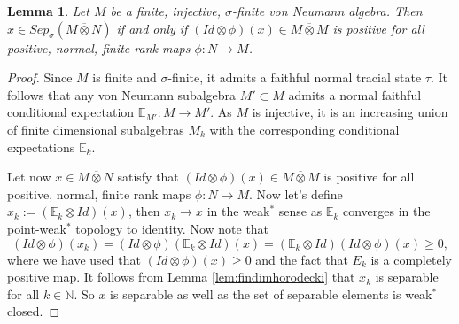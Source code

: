 \documentclass[10pt,a4paper]{amsart}
\newtheorem{lemma}{Lemma}
\begin{document}
\begin{lemma}
Let $M$ be a finite, injective, $\sigma$-finite von Neumann algebra. Then $x\in Sep_{\sigma}(M\overline{\otimes} N)$ if and only if $(Id\otimes \phi)(x) \in M\overline{\otimes} M$ is positive for all positive, normal, finite rank maps $\phi: N \to M$.
\end{lemma}

\begin{proof}
Since $M$ is finite and $\sigma$-finite, it admits a faithful normal tracial state $\tau$. It follows that any von Neumann subalgebra $M' \subset M$ admits a normal faithful conditional expectation $\mathbb{E}_{M'}: M \to M'$. As $M$ is injective, it is an increasing union of finite dimensional subalgebras $M_{k}$ with the corresponding conditional expectations $\mathbb{E}_{k}$.

Let now $x \in M \overline{\otimes} N$ satisfy that $(Id\otimes \phi)(x) \in M\overline{\otimes} M$ is positive for all positive, normal, finite rank maps $\phi: N \to M$. Now let's define $x_k:=(\mathbb{E}_{k}\otimes Id)(x)$, then $x_k\rightarrow x$ in the weak$^*$ sense as $\mathbb{E}_{k}$ converges in the point-weak$^{\ast}$ topology to identity. Now note that 
\[(Id\otimes \phi)(x_k)=(Id\otimes \phi)(\mathbb{E}_{k}\otimes Id)(x)=(\mathbb{E}_{k}\otimes Id)(Id\otimes \phi)(x)\geq0,\]
where we have used that $(Id\otimes \phi)(x)\geq 0$ and the fact that $E_k$ is a completely positive map. 
 It follows from Lemma \ref{lem:findimhorodecki} that $x_k$ is separable for all $k \in \mathbb{N}$. So $x$ is separable as well as the set of separable elements is weak$^*$ closed. 
\end{proof}
\end{document}
